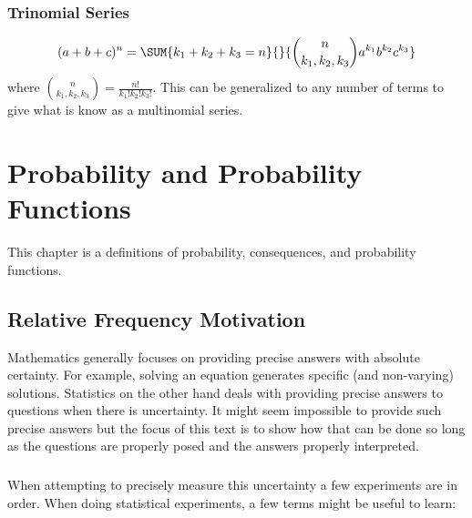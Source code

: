 \documentclass[10pt,]{book}
\theoremstyle{plain}
\theoremstyle{definition}
\theoremstyle{definition}
\numberwithin{equation}{section}
\begin{document}
\subsection[Trinomial Series]{Trinomial Series}\label{subsection-6}
\begin{gather*}
(a+b+c)^n = \SUM {k_1+k_2+k_3=n} {} {\binom{n}{k_1,k_2,k_3} a^{k_1} b^{k_2} c^{k_3}} 
\end{gather*}where \(\binom{n}{k_1,k_2,k_3} = \frac{n!}{k_1!k_2!k_3!}\). This can be generalized to any number 
		of terms to give what
		is know as a multinomial series.%
\typeout{************************************************}
\typeout{************************************************}
\chapter[Probability and Probability Functions]{Probability and Probability Functions}\label{ProbabilityGeneralities}
\typeout{************************************************}
\typeout{************************************************}
This chapter is a definitions of probability, consequences, and probability functions.%
\typeout{************************************************}
\typeout{************************************************}
\section[Relative Frequency Motivation]{Relative Frequency Motivation}\label{RelativeFrequency}
Mathematics generally focuses on providing precise answers with absolute certainty. For example, solving an equation generates specific (and non-varying) solutions. Statistics on the other hand deals with providing precise answers to questions when there is uncertainty. It might seem impossible to provide such precise answers but the focus of this text is to show how that can be done so long as the questions are properly posed and the answers properly interpreted.%
\typeout{************************************************}
\typeout{************************************************}
\subsection[]{}\label{subsection-7}
When attempting to precisely measure this uncertainty a few experiments are in order. When doing statistical experiments, a few terms might be useful to learn:%
\par
\end{document}
